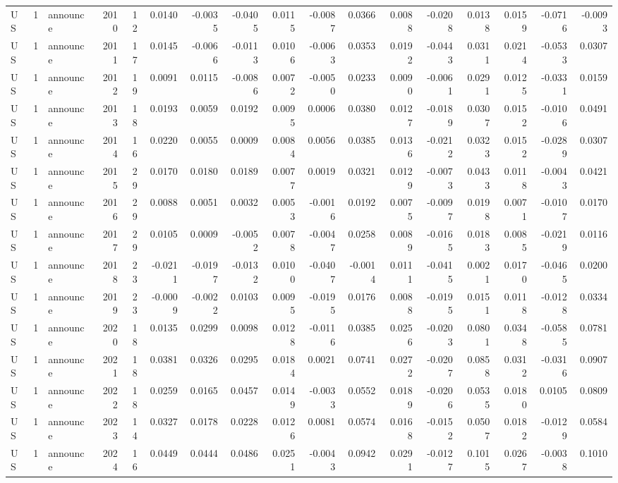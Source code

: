 \begin{tabular}{lrlrrrrrrrrrrrrrr}
US & 1 & announce & 2010 & 12 & 0.0140 & -0.0035 & -0.0405 & 0.0115 & -0.0087 & 0.0366 & 0.0088 & -0.0208 & 0.0138 & 0.0159 & -0.0716 & -0.0093 \\
US & 1 & announce & 2011 & 17 & 0.0145 & -0.0066 & -0.0113 & 0.0106 & -0.0063 & 0.0353 & 0.0192 & -0.0443 & 0.0311 & 0.0214 & -0.0533 & 0.0307 \\
US & 1 & announce & 2012 & 19 & 0.0091 & 0.0115 & -0.0086 & 0.0072 & -0.0050 & 0.0233 & 0.0090 & -0.0061 & 0.0291 & 0.0125 & -0.0331 & 0.0159 \\
US & 1 & announce & 2013 & 18 & 0.0193 & 0.0059 & 0.0192 & 0.0095 & 0.0006 & 0.0380 & 0.0127 & -0.0189 & 0.0307 & 0.0152 & -0.0106 & 0.0491 \\
US & 1 & announce & 2014 & 16 & 0.0220 & 0.0055 & 0.0009 & 0.0084 & 0.0056 & 0.0385 & 0.0136 & -0.0212 & 0.0323 & 0.0152 & -0.0289 & 0.0307 \\
US & 1 & announce & 2015 & 29 & 0.0170 & 0.0180 & 0.0189 & 0.0077 & 0.0019 & 0.0321 & 0.0129 & -0.0073 & 0.0433 & 0.0118 & -0.0043 & 0.0421 \\
US & 1 & announce & 2016 & 29 & 0.0088 & 0.0051 & 0.0032 & 0.0053 & -0.0016 & 0.0192 & 0.0075 & -0.0097 & 0.0198 & 0.0071 & -0.0107 & 0.0170 \\
US & 1 & announce & 2017 & 29 & 0.0105 & 0.0009 & -0.0052 & 0.0078 & -0.0047 & 0.0258 & 0.0089 & -0.0165 & 0.0183 & 0.0085 & -0.0219 & 0.0116 \\
US & 1 & announce & 2018 & 23 & -0.0211 & -0.0197 & -0.0132 & 0.0100 & -0.0407 & -0.0014 & 0.0111 & -0.0415 & 0.0021 & 0.0170 & -0.0465 & 0.0200 \\
US & 1 & announce & 2019 & 23 & -0.0009 & -0.0022 & 0.0103 & 0.0095 & -0.0195 & 0.0176 & 0.0088 & -0.0195 & 0.0151 & 0.0118 & -0.0128 & 0.0334 \\
US & 1 & announce & 2020 & 18 & 0.0135 & 0.0299 & 0.0098 & 0.0128 & -0.0116 & 0.0385 & 0.0256 & -0.0203 & 0.0801 & 0.0348 & -0.0585 & 0.0781 \\
US & 1 & announce & 2021 & 18 & 0.0381 & 0.0326 & 0.0295 & 0.0184 & 0.0021 & 0.0741 & 0.0272 & -0.0207 & 0.0858 & 0.0312 & -0.0316 & 0.0907 \\
US & 1 & announce & 2022 & 18 & 0.0259 & 0.0165 & 0.0457 & 0.0149 & -0.0033 & 0.0552 & 0.0189 & -0.0206 & 0.0535 & 0.0180 & 0.0105 & 0.0809 \\
US & 1 & announce & 2023 & 14 & 0.0327 & 0.0178 & 0.0228 & 0.0126 & 0.0081 & 0.0574 & 0.0168 & -0.0152 & 0.0507 & 0.0182 & -0.0129 & 0.0584 \\
US & 1 & announce & 2024 & 16 & 0.0449 & 0.0444 & 0.0486 & 0.0251 & -0.0043 & 0.0942 & 0.0291 & -0.0127 & 0.1015 & 0.0267 & -0.0038 & 0.1010 \\

\end{tabular}
